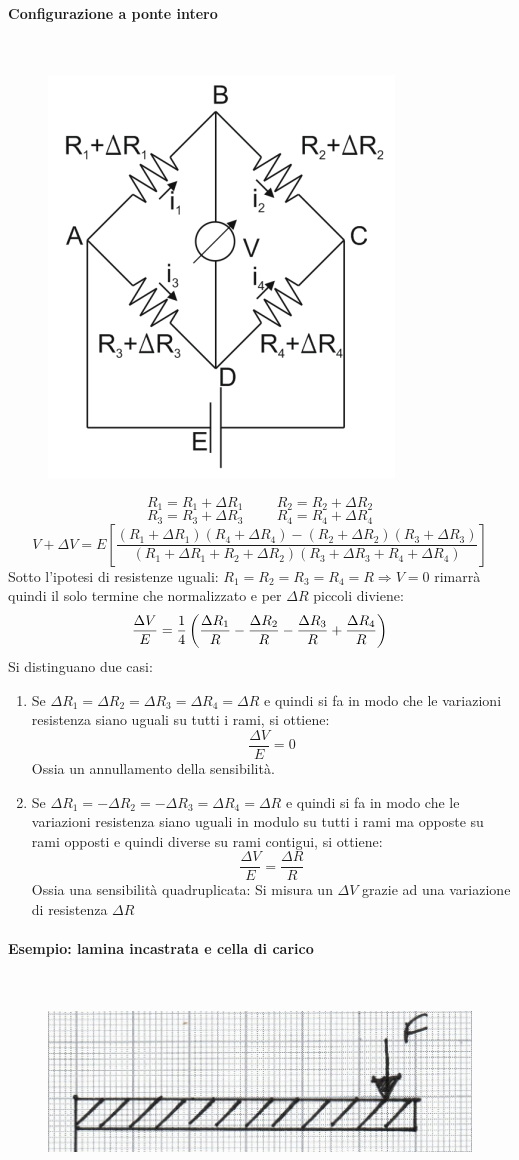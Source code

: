 \documentclass[a4paper, 15pt]{article}
\begin{document}
\begin{adjustwidth}{2in}{}
\paragraph{Configurazione a ponte intero} \mbox{} \\
		\begin{figure}[H]
			\centering
			\includegraphics[width=0.3\linewidth]{fig/screenshot018}
			\label{fig:screenshot018}
		\end{figure}
		\[R_1 = R_1 + \Delta R_1 \hspace{1cm} R_2 = R_2 + \Delta R_2 \]
		\[R_3 = R_3 + \Delta R_3 \hspace{1cm} R_4 = R_4 + \Delta R_4 \]
		\[V+\Delta V = E\left[\dfrac{(R_1+ \Delta R_1)(R_4 + \Delta R_4)-(R_2 + \Delta R_2)(R_3 + \Delta R_3)}{(R_1+ \Delta R_1+R_2 + \Delta R_2)(R_3 + \Delta R_3+ R_4 + \Delta R_4)}\right]\]
		Sotto l'ipotesi di resistenze uguali: $R_1=R_2=R_3=R_4=R\Rightarrow V=0$ rimarrà quindi il solo termine che normalizzato e per $\Delta R$ piccoli diviene:
		\[\dfrac{\Delta V}{E} = {1\over4}\left(\dfrac{\Delta R_1}{R} - \dfrac{\Delta R_2}{R} - \dfrac{\Delta R_3}{R} + \dfrac{\Delta R_4}{R}\right)\]
		Si distinguano due casi:
		\begin{enumerate}
			\item Se $\Delta R_1 = \Delta R_2 = \Delta R_3 = \Delta R_4 = \Delta R$ e quindi si fa in modo che le variazioni resistenza siano uguali su tutti i rami, si ottiene:
			\[\dfrac{\Delta V}{E} = 0\]
			Ossia un annullamento della sensibilità.
			
			\item Se $\Delta R_1 = -\Delta R_2 = -\Delta R_3 = \Delta R_4 = \Delta R$ e quindi si fa in modo che le variazioni resistenza siano uguali in modulo su tutti i rami ma opposte su rami opposti e quindi diverse su rami contigui, si ottiene:
			\[\dfrac{\Delta V}{E} = \dfrac{\Delta R}{R}\]
			Ossia una sensibilità quadruplicata: Si misura un $\Delta V$ grazie ad una variazione di resistenza $\Delta R$			
		\end{enumerate}
\newpage
		\paragraph{Esempio: lamina incastrata e cella di carico}\mbox{} \\ 
		\begin{figure}[H]
			\centering
			\includegraphics[width=0.3\linewidth]{fig/mm_1}
			\label{fig:mm1}
		\end{figure}


\end{adjustwidth}
\end{document}
